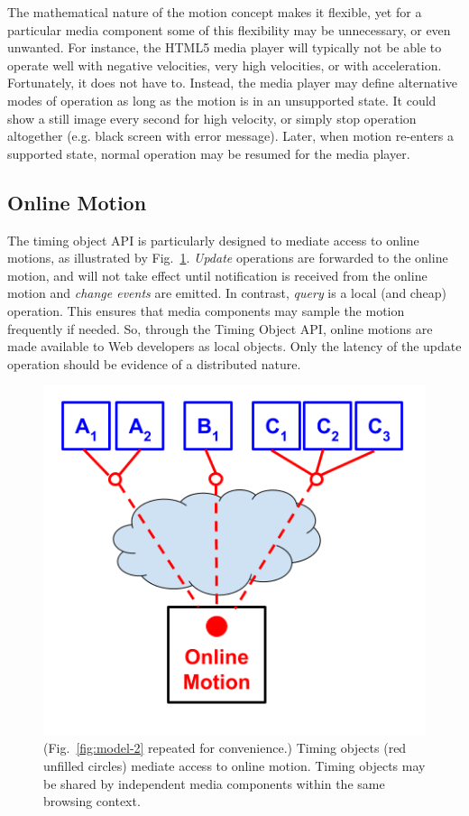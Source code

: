 \label{sec:toomuch}

The mathematical nature of the motion concept makes it flexible, yet for a
particular media component some of this flexibility may be unnecessary, or
even unwanted. For instance, the HTML5 media player will typically not be able
to operate well with negative velocities, very high velocities, or with
acceleration. Fortunately, it does not have to. Instead, the media player may
define alternative modes of operation as long as the motion is in an
unsupported state. It could show a still image every second for high velocity,
or simply stop operation altogether (e.g. black screen with error message).
Later, when motion re-enters a supported state, normal operation may be
resumed for the media player.


\subsection{Online Motion}
\label{sec:motionsync}

The timing object API is particularly designed to mediate access to online motions,
as illustrated by Fig.~\ref{fig:model-repeat}. \emph{Update} operations are forwarded to the
online motion, and will not take effect until notification is received from
the online motion and \emph{change events} are emitted. In contrast, \emph{query} is a local
(and cheap) operation. This ensures that media components may sample the
motion frequently if needed. So, through the Timing Object API, online motions
are made available to Web developers as local objects. Only the latency of the
update operation should be evidence of a distributed nature.

\begin{figure}[h]
\centering
\includegraphics[scale=.3]{fig/motion-model-2.png}
\caption{(Fig.~\ref{fig:model-2} repeated for convenience.) Timing objects (red unfilled circles) mediate access to online motion. Timing objects may be shared by independent media components within the same browsing context.}
\label{fig:model-repeat}
\end{figure}

